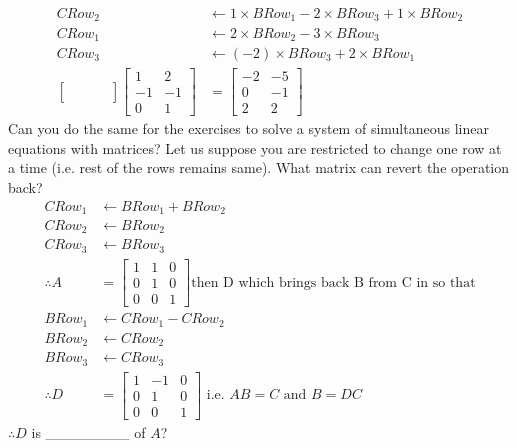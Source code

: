 \documentclass{article}
\begin{document}
\begin{align}
    CRow_2 &\leftarrow 1\times BRow_1 - 2 \times BRow_3 + 1 \times BRow_2\nonumber\\
    CRow_1 &\leftarrow 2 \times BRow_2 - 3 \times BRow_3\nonumber\\
    CRow_3 &\leftarrow (-2)\times BRow_3 + 2 \times BRow_1\nonumber\\
    \begin{bmatrix}
     & & &\\
     & & &\\
     & & &
    \end{bmatrix}\begin{bmatrix}
                     1 & 2\\
                    -1 & -1\\
                     0 & 1
                \end{bmatrix} &= \begin{bmatrix}
                                    -2 & -5\\
                                     0 & -1\\
                                     2 & 2
                                 \end{bmatrix}\nonumber
\end{align}
Can you do the same for the exercises to solve a system of simultaneous linear equations with matrices? Let us suppose you are restricted to change one row at a time (i.e. rest of the rows remains same). What matrix can revert the operation back?\\
\begin{align}
    CRow_1 &\leftarrow BRow_1 + BRow_2 \nonumber \\
    CRow_2 &\leftarrow BRow_2\nonumber\\
    CRow_3 &\leftarrow BRow_3\nonumber\\
    \therefore A &= \begin{bmatrix}
                        1 & 1 & 0\\
                        0 & 1 & 0\\
                        0 & 0 & 1
                    \end{bmatrix} \text{then D which brings back B from C in so that} \nonumber\\
    BRow_1 &\leftarrow CRow_1 - CRow_2\nonumber\\
    BRow_2 &\leftarrow CRow_2\nonumber\\
    BRow_3 &\leftarrow CRow_3\nonumber\\
    \therefore D &= \begin{bmatrix}
                        1 & -1 & 0\\
                        0 & 1 & 0\\
                        0 & 0 & 1
                    \end{bmatrix} \text{ i.e. } AB = C \text{ and } 
                                        B = DC \nonumber
\end{align}
$\therefore D$ is \_\_\_\_\_\_\_\_ of $A$? \\
\end{document}

